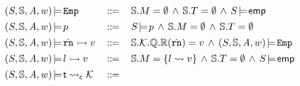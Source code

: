 \begin{figure*}[!t]
    \centering
    \vspace{-0.5em}
    \[
        \begin{array}{lcl}
            \asrtmodel{(\state, \hpstate, \primcom, \word)}
            {\empAst} & \define & 
            \hpstate.\Mem = \emptyset \, \land \, 
            \hpstate.\thrdpool = \emptyset \, \land \, 
            \asrtmodel{\state}{\aemp} \\
            \\[-8pt]
            \asrtmodel{(\state, \hpstate, \primcom, \word)}{\astP}
            & \, \define \, & 
            \asrtmodel{\state}{\astP} \, \land \, 
            \hpstate.\Mem = \emptyset \, \land \, 
            \hpstate.\thrdpool = \emptyset  \\
            \\[-8pt]
            \asrtmodel{(\state, \hpstate, \primcom, \word)}
                {\hregsto{\hrn}{\val}} & \define & 
                \hpstate.\hthrdlocalst.\hRstate.\hRfile(\hrn) 
                = \val \, \land \, 
                \asrtmodel{(\state, \hpstate, \primcom, \word)}{\empAst}
            \\
            \\[-8pt]
            \asrtmodel{(\state, \hpstate, \primcom, \word)}
                {\hmsto{\loc}{\val}} & \define & 
                \hpstate.\Mem = \{ \loc \rightsquigarrow \val \}
                \, \land \, 
                \hpstate.\thrdpool = \emptyset \, \land \, 
                \asrtmodel{\state}{\aemp} \\
            \\[-8pt]
            \asrtmodel{(\state, \hpstate, \primcom, \word)}
                {\astCurCont{\thrdid}{\hthrdlocalst}}
                & \define & 

\end{array}\]
\end{figure*}
